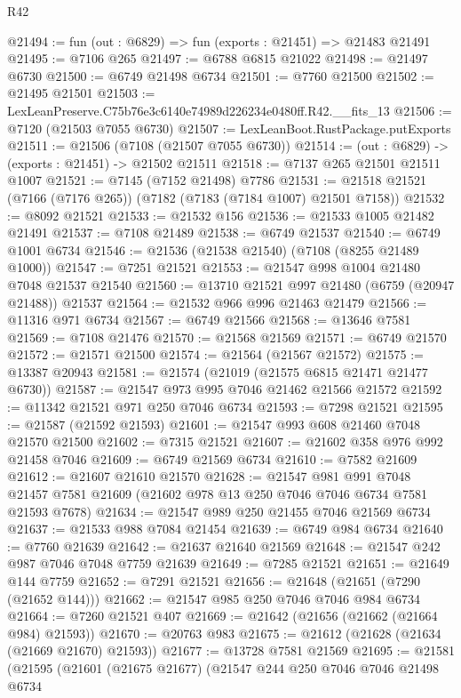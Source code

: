 \begin{lexlean}{R42}
\begin{coremodule}
{@21494 := fun (out : @6829) => fun (exports : @21451) => @21483 @21491
@21495 := @7106 @265
@21497 := @6788 @6815 @21022
@21498 := @21497 @6730
@21500 := @6749 @21498 @6734
@21501 := @7760 @21500
@21502 := @21495 @21501
@21503 := LexLeanPreserve.C75b76e3c6140e74989d226234e0480ff.R42.__fits_13
@21506 := @7120 (@21503 @7055 @6730)
@21507 := LexLeanBoot.RustPackage.putExports
@21511 := @21506 (@7108 (@21507 @7055 @6730))
@21514 := (out : @6829) -> (exports : @21451) -> @21502 @21511
@21518 := @7137 @265 @21501 @21511 @1007
@21521 := @7145 (@7152 @21498) @7786
@21531 := @21518 @21521 (@7166 (@7176 @265)) (@7182 (@7183 (@7184 @1007) @21501 @7158))
@21532 := @8092 @21521
@21533 := @21532 @156
@21536 := @21533 @1005 @21482 @21491
@21537 := @7108 @21489
@21538 := @6749 @21537
@21540 := @6749 @1001 @6734
@21546 := @21536 (@21538 @21540) (@7108 (@8255 @21489 @1000))
@21547 := @7251 @21521
@21553 := @21547 @998 @1004 @21480 @7048 @21537 @21540
@21560 := @13710 @21521 @997 @21480 (@6759 (@20947 @21488)) @21537
@21564 := @21532 @966 @996 @21463 @21479
@21566 := @11316 @971 @6734
@21567 := @6749 @21566
@21568 := @13646 @7581
@21569 := @7108 @21476
@21570 := @21568 @21569
@21571 := @6749 @21570
@21572 := @21571 @21500
@21574 := @21564 (@21567 @21572)
@21575 := @13387 @20943
@21581 := @21574 (@21019 (@21575 @6815 @21471 @21477 @6730))
@21587 := @21547 @973 @995 @7046 @21462 @21566 @21572
@21592 := @11342 @21521 @971 @250 @7046 @6734
@21593 := @7298 @21521
@21595 := @21587 (@21592 @21593)
@21601 := @21547 @993 @608 @21460 @7048 @21570 @21500
@21602 := @7315 @21521
@21607 := @21602 @358 @976 @992 @21458 @7046
@21609 := @6749 @21569 @6734
@21610 := @7582 @21609
@21612 := @21607 @21610 @21570
@21628 := @21547
    @981
    @991
    @7048
    @21457
    @7581
    @21609
    (@21602 @978 @13 @250 @7046 @7046 @6734 @7581 @21593 @7678)
@21634 := @21547 @989 @250 @21455 @7046 @21569 @6734
@21637 := @21533 @988 @7084 @21454
@21639 := @6749 @984 @6734
@21640 := @7760 @21639
@21642 := @21637 @21640 @21569
@21648 := @21547 @242 @987 @7046 @7048 @7759 @21639
@21649 := @7285 @21521
@21651 := @21649 @144 @7759
@21652 := @7291 @21521
@21656 := @21648 (@21651 (@7290 (@21652 @144)))
@21662 := @21547 @985 @250 @7046 @7046 @984 @6734
@21664 := @7260 @21521 @407
@21669 := @21642 (@21656 (@21662 (@21664 @984) @21593))
@21670 := @20763 @983
@21675 := @21612 (@21628 (@21634 (@21669 @21670) @21593))
@21677 := @13728 @7581 @21569
@21695 := @21581
    (@21595
      (@21601
        (@21675 @21677)
        (@21547
          @244
          @250
          @7046
          @7046
          @21498
          @6734
}
\end{coremodule}
\end{lexlean}
